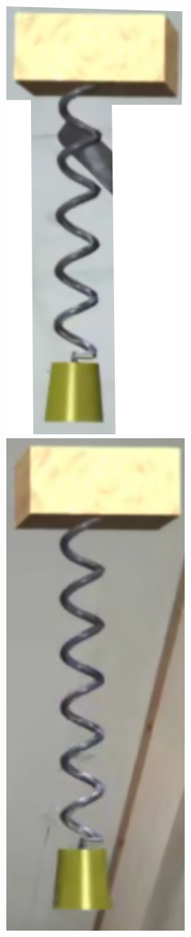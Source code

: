\documentclass[11pt, a4paper]{article}\usepackage[]{graphicx}\usepackage[]{xcolor}
\begin{document}
\begin{figure}[h]
	\centering
	\includegraphics[scale = 0.30]{download(1)}
	\hspace{100pt}
	\includegraphics[scale = 0.35]{Screenshot (1480)}\\
\end{figure}
\end{document}
